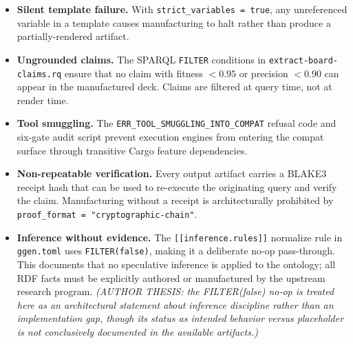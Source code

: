 \begin{itemize}
  \item \textbf{Silent template failure.} With \texttt{strict\_variables = true}, any
    unreferenced variable in a template causes manufacturing to halt rather than produce a
    partially-rendered artifact.
  \item \textbf{Ungrounded claims.} The SPARQL \texttt{FILTER} conditions in
    \texttt{extract-board-claims.rq} ensure that no claim with fitness $< 0.95$ or precision
    $< 0.90$ can appear in the manufactured deck. Claims are filtered at query time, not at
    render time.
  \item \textbf{Tool smuggling.} The \texttt{ERR\_TOOL\_SMUGGLING\_INTO\_COMPAT} refusal code
    and six-gate audit script prevent execution engines from entering the compat surface through
    transitive Cargo feature dependencies.
  \item \textbf{Non-repeatable verification.} Every output artifact carries a BLAKE3 receipt hash
    that can be used to re-execute the originating query and verify the claim. Manufacturing
    without a receipt is architecturally prohibited by \texttt{proof\_format = "cryptographic-chain"}.
  \item \textbf{Inference without evidence.} The \texttt{[[inference.rules]]} normalize rule in
    \texttt{ggen.toml} uses \texttt{FILTER(false)}, making it a deliberate no-op pass-through.
    This documents that no speculative inference is applied to the ontology; all RDF facts must
    be explicitly authored or manufactured by the upstream research program. \textit{(AUTHOR
    THESIS: the FILTER(false) no-op is treated here as an architectural statement about inference
    discipline rather than an implementation gap, though its status as intended behavior versus
    placeholder is not conclusively documented in the available artifacts.)}
\end{itemize}

